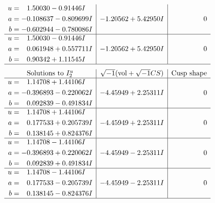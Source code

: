 \documentclass[1p]{elsarticle_modified}
\theoremstyle{definition}
\newcommand{\I}{\sqrt{-1}}
\begin{document}
$$\begin{array}{c|c|c}
\begin{aligned}
u &= \phantom{-}1.50030 - 0.91446 I \\
a &= -0.108637 - 0.809699 I \\
b &= -0.602944 - 0.780086 I\end{aligned}
 & -1.20562 + 5.42950 I & \phantom{-0.000000 } 0 \\ \hline\begin{aligned}
u &= \phantom{-}1.50030 - 0.91446 I \\
a &= \phantom{-}0.061948 + 0.557711 I \\
b &= \phantom{-}0.90342 + 1.11545 I\end{aligned}
 & -1.20562 + 5.42950 I & \phantom{-0.000000 } 0\\
 \hline 
 \end{array}$$\newpage$$\begin{array}{c|c|c}  
\text{Solutions to }I^u_{2}& \I (\text{vol} + \sqrt{-1}CS) & \text{Cusp shape}\\
 \hline 
\begin{aligned}
u &= \phantom{-}1.14708 + 1.44106 I \\
a &= -0.396893 - 0.220062 I \\
b &= \phantom{-}0.092839 - 0.491834 I\end{aligned}
 & -4.45949 + 2.25311 I & \phantom{-0.000000 } 0 \\ \hline\begin{aligned}
u &= \phantom{-}1.14708 + 1.44106 I \\
a &= \phantom{-}0.177533 + 0.205739 I \\
b &= \phantom{-}0.138145 + 0.824376 I\end{aligned}
 & -4.45949 + 2.25311 I & \phantom{-0.000000 } 0 \\ \hline\begin{aligned}
u &= \phantom{-}1.14708 - 1.44106 I \\
a &= -0.396893 + 0.220062 I \\
b &= \phantom{-}0.092839 + 0.491834 I\end{aligned}
 & -4.45949 - 2.25311 I & \phantom{-0.000000 } 0 \\ \hline\begin{aligned}
u &= \phantom{-}1.14708 - 1.44106 I \\
a &= \phantom{-}0.177533 - 0.205739 I \\
b &= \phantom{-}0.138145 - 0.824376 I\end{aligned}
 & -4.45949 - 2.25311 I & \phantom{-0.000000 } 0\\
 \hline 
 \end{array}$$\newpage\newpage\renewcommand{\arraystretch}{1}
\end{document}
